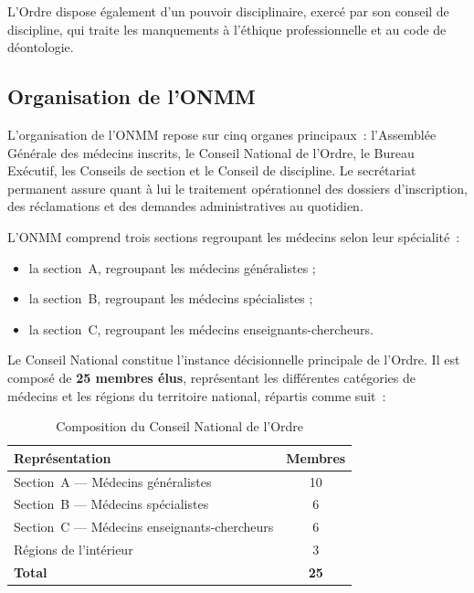 ﻿\documentclass[12pt,a4paper]{report}
\begin{document}
L'Ordre dispose également d'un pouvoir disciplinaire, exercé par son conseil
de discipline, qui traite les manquements à l'éthique professionnelle et au
code de déontologie.

\subsection{Organisation de l'ONMM}

L'organisation de l'ONMM repose sur cinq organes principaux~: l'Assemblée
Générale des médecins inscrits, le Conseil National de l'Ordre, le Bureau
Exécutif, les Conseils de section et le Conseil de discipline. Le
secrétariat permanent assure quant à lui le traitement opérationnel des
dossiers d'inscription, des réclamations et des demandes administratives
au quotidien.

L'ONMM comprend trois sections regroupant les médecins selon leur
spécialité~:

\begin{itemize}
    \item la section~A, regroupant les médecins généralistes ;
    \item la section~B, regroupant les médecins spécialistes ;
    \item la section~C, regroupant les médecins enseignants-chercheurs.
\end{itemize}

Le Conseil National constitue l'instance décisionnelle principale de
l'Ordre. Il est composé de \textbf{25 membres élus}, représentant les
différentes catégories de médecins et les régions du territoire national,
répartis comme suit~:

\begin{table}[H]
\centering
\renewcommand{\arraystretch}{1.3}
\begin{tabularx}{0.82\textwidth}{|X|c|}
\hline
\textbf{Représentation} & \textbf{Membres} \\
\hline
Section~A — Médecins généralistes & 10 \\
\hline
Section~B — Médecins spécialistes & 6 \\
\hline
Section~C — Médecins enseignants-chercheurs & 6 \\
\hline
Régions de l'intérieur & 3 \\
\hline
\textbf{Total} & \textbf{25} \\
\hline
\end{tabularx}
\caption{Composition du Conseil National de l'Ordre}
\label{tab:conseil-national}
\end{table}
\end{document}
